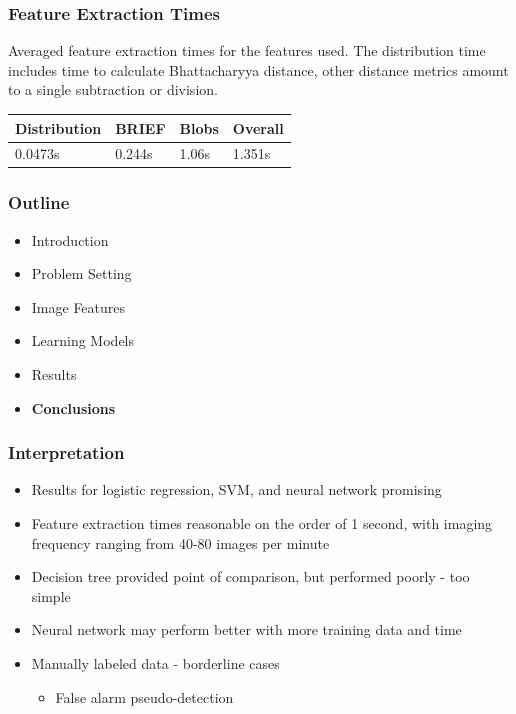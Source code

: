 \documentclass{beamer}
\begin{document}
\begin{frame}
\frametitle{Feature Extraction Times}
Averaged feature extraction times for the features used.
The distribution time includes time to calculate Bhattacharyya distance, other distance metrics amount to a single subtraction or division.
\begin{table}[h!]
  \centering
  \begin{tabular}{|l|l|l|l|}
    \hline
    Distribution & BRIEF & Blobs & Overall  \\ \hline
    0.0473s & 0.244s & 1.06s & 1.351s  \\ \hline

  \end{tabular}
\end{table}
\end{frame}


\begin{frame}
\frametitle{Outline}
\begin{itemize}
  \item Introduction
  \item\vspace{0.5cm}Problem Setting
  \item\vspace{0.5cm}Image Features
  \item \vspace{0.5cm}Learning Models
  \item \vspace{0.5cm}Results
  \item \vspace{0.5cm} \textbf{Conclusions}
\end{itemize}
\end{frame}


\begin{frame}
\frametitle{Interpretation}
\begin{itemize}
  \item Results for logistic regression, SVM, and neural network promising
  \item Feature extraction times reasonable on the order of 1 second, with imaging frequency ranging from 40-80 images per minute
  \item Decision tree provided point of comparison, but performed poorly - too simple
  \item Neural network may perform better with more training data and time
  \item Manually labeled data - borderline cases
  \begin{itemize}
    \item False alarm pseudo-detection
  \end{itemize}
\end{itemize}
\end{frame}
\end{document}
